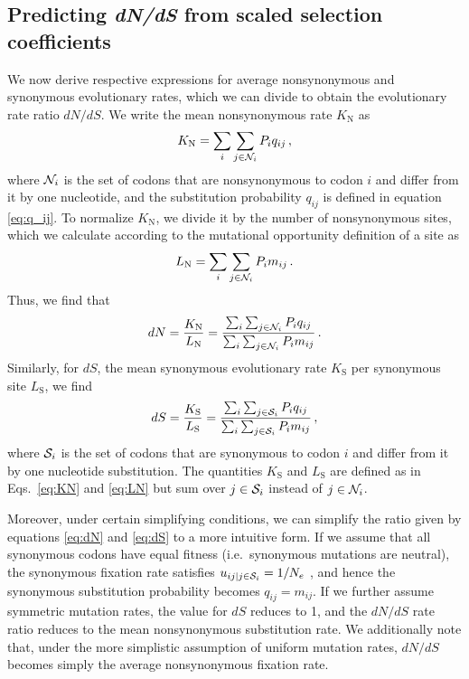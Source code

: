 \documentclass[11pt]{article}
\begin{document}
		
\subsection*{Predicting \emph{dN/dS} from scaled selection coefficients} 

We now derive respective expressions for average nonsynonymous and synonymous evolutionary rates, which we can divide to obtain the evolutionary rate ratio $dN/dS$. We write the mean nonsynonymous rate $K_\text{N}$ as 
\begin{equation}\label{eq:KN}
	K_\text{N} = \sum_i \sum_{j \in {\cal N}_i} P_i q_{ij} \,,
\end{equation}
where ${\cal N}_i$ is the set of codons that are nonsynonymous to codon $i$ and differ from it by one nucleotide, and the substitution probability $q_{ij}$ is defined in equation \eqref{eq:q_ij}. To normalize $K_\text{N}$, we divide it by the number of nonsynonymous sites, which we calculate according to the mutational opportunity definition of a site \citep{GoldmanYang1994, Yang2006} as 
\begin{equation}\label{eq:LN}
	L_\text{N} = \sum_i \sum_{j \in {\cal N}_i} P_i m_{ij}\, .
\end{equation} Thus, we find that 
\begin{equation}\label{eq:dN}
	dN = \frac{K_\text{N}}{L_\text{N}}=\frac{\sum_i \sum_{j \in {\cal N}_i} P_i q_{ij}} {\sum_i \sum_{j \in {\cal N}_i}P_i m_{ij}}\,.
\end{equation} Similarly, for $dS$, the mean synonymous evolutionary rate $K_\text{S}$ per synonymous site $L_\text{S}$, we find
\begin{equation}\label{eq:dS}
	dS = \frac{K_\text{S}}{L_\text{S}}=\frac{\sum_i \sum_{j \in {\cal S}_i} P_i q_{ij} } {\sum_i \sum_{j \in {\cal S}_i} P_i m_{ij} }\,,
\end{equation}
where ${\cal S}_i$ is the set of codons that are synonymous to codon $i$ and differ from it by one nucleotide substitution. The quantities $K_\text{S}$ and $L_\text{S}$ are defined as in Eqs.~\eqref{eq:KN} and \eqref{eq:LN} but sum over $j\in {\cal S}_i$ instead of $j\in {\cal N}_i$. 

Moreover, under certain simplifying conditions, we can simplify the ratio given by equations \eqref{eq:dN} and \eqref{eq:dS} to a more intuitive form. 
If we assume that all synonymous codons have equal fitness (i.e.\ synonymous mutations are neutral), the synonymous fixation rate satisfies $u_{ij | j \in {\cal S}_i} = 1/N_e$ \citep{CrowKimura1970}, and hence the synonymous substitution probability becomes $q_{ij} = m_{ij}$. If we further assume symmetric mutation rates, the value for $dS$ reduces to 1, and the $dN/dS$ rate ratio reduces to the mean nonsynonymous substitution rate. We additionally note that, under the more simplistic assumption of uniform mutation rates, $dN/dS$ becomes simply the average nonsynonymous fixation rate.
\end{document}
